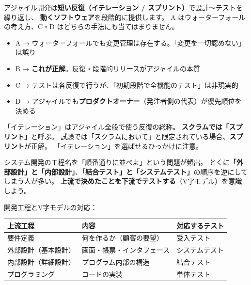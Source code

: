 \begin{kaisetsu}
アジャイル開発は\textbf{短い反復（イテレーション / スプリント）}で設計〜テストを繰り返し、
\textbf{動くソフトウェア}を段階的に提供します。
A はウォーターフォールの考え方、C・D はどちらの手法にも当てはまりません。
\end{kaisetsu}
\begin{goutoubun}
\begin{itemize}
  \item A → ウォーターフォールでも変更管理は存在する。「変更を一切認めない」は誤り
  \item B → \textbf{これが正解}。反復・段階的リリースがアジャイルの本質
  \item C → テストは各反復で行うが、「初期段階で全機能のテスト」は非現実的
  \item D → アジャイルでも\textbf{プロダクトオーナー}（発注者側の代表）が優先順位を決める
\end{itemize}
\end{goutoubun}

\begin{trickwarn}
「イテレーション」はアジャイル全般で使う反復の総称。
\textbf{スクラムでは「スプリント」}と呼ぶ。
試験では「スクラムにおいて」と限定されている場合、\textbf{スプリント}が正解。
「イテレーション」を選ばせるひっかけに注意。
\end{trickwarn}




\mondaipage
{}

\begin{stumble}
システム開発の工程名を「順番通りに並べよ」という問題が頻出。
とくに\textbf{「外部設計」と「内部設計」}、\textbf{「結合テスト」と「システムテスト」}の順序を逆にしてしまう人が多い。
\textbf{上流で決めたことを下流でテストする}（V字モデル）を意識しよう。
\end{stumble}

\begin{keypoint}
開発工程とV字モデルの対応：
\begin{center}
\begin{tabularx}{0.9\textwidth}{lXl}
  \toprule
  \textbf{上流工程} & \textbf{内容} & \textbf{対応するテスト} \\
  \midrule
  要件定義 & 何を作るか（顧客の要望） & 受入テスト \\
  外部設計（基本設計） & 画面・帳票・インタフェース & システムテスト \\
  内部設計（詳細設計） & プログラム内部の構造 & 結合テスト \\
  プログラミング & コードの実装 & 単体テスト \\
  \bottomrule
\end{tabularx}
\end{center}
\end{keypoint}

